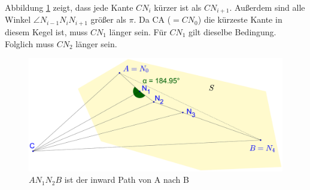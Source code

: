 \documentclass[a4paper,twoside]{IEEEtran}
\begin{document}
Abbildung \ref{fig:inward_path_prop} zeigt, dass jede Kante $CN_i $ kürzer ist als $CN_{i+1}$. 
Außerdem sind alle Winkel $\angle{N_{i-1}N_iN_{i+1}} $ größer als $\pi $.
Da CA ($= CN_0 $) die kürzeste Kante in diesem Kegel ist, muss $CN_1 $ länger sein. 
Für $CN_1 $ gilt dieselbe Bedingung. 
Folglich muss $CN_2 $ länger sein.


\begin{figure}[h!]
\centering
\includegraphics[width=1\linewidth]{inward_path_prop.eps}
\caption{$AN_1N_2B $ ist der inward Path von A nach B}
\label{fig:inward_path_prop}
\end{figure}








\end{document}
